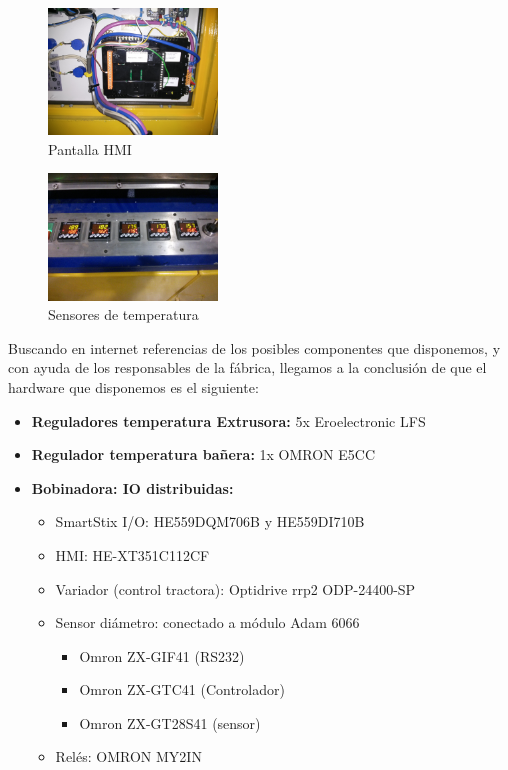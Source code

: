     \begin{figure}[H]
            \centering
            \includegraphics[width=0.4\textwidth]{images/huesca/IMG_20141216_175108.jpg}
            \caption{Pantalla HMI}
            \label{fig:hardware_HMI}
    \end{figure}

     \begin{figure}[H]
            \centering
            \includegraphics[width=0.4\textwidth]{images/huesca/IMG_20141216_175204.jpg}
            \caption{Sensores de temperatura}
            \label{fig:hardware_temperatura}
    \end{figure}

Buscando en internet referencias de los posibles componentes que disponemos, y con ayuda de los responsables de la fábrica, llegamos a la conclusión de que el hardware que disponemos es el siguiente:

\begin{itemize}
	\item \textbf{Reguladores temperatura Extrusora:} 5x Eroelectronic LFS
	\item \textbf{Regulador temperatura bañera:} 1x OMRON E5CC
	\item \textbf{Bobinadora: IO distribuidas: }
	\begin{itemize}

       \item {SmartStix I/O:} HE559DQM706B y HE559DI710B
       \item{HMI:} HE-XT351C112CF
        \item{Variador (control tractora):} Optidrive rrp2 ODP-24400-SP
        \item{Sensor diámetro:} conectado a módulo Adam 6066
        	\begin{itemize}
        				\item Omron ZX-GIF41 (RS232)
        				\item Omron ZX-GTC41 (Controlador)
                        \item Omron ZX-GT28S41 (sensor)
             \end{itemize}
        \item Relés: OMRON MY2IN
    \end{itemize}
\end{itemize}

